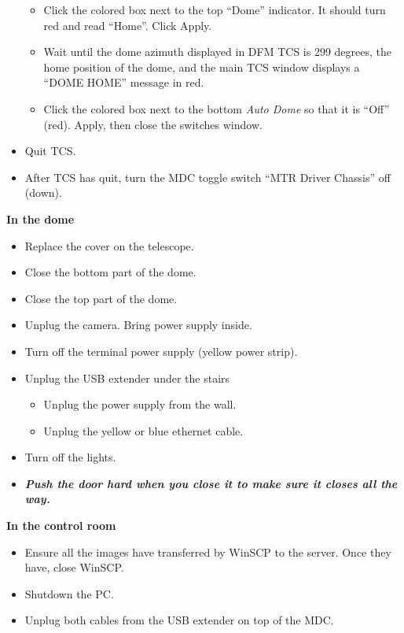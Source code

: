 \documentclass[letterpaper, 12pt]{report}
\newcommand{\location}[1]{\noindent\large{\textbf{#1}}}
\newcommand{\indome}{\location{In the dome}}
\newcommand{\incontrol}{\location{In the control room}}
\begin{document}
\begin{itemize}
\begin{itemize}
			\item Click the colored box next to the top ``Dome'' indicator. It should turn red and read ``Home''. Click Apply.
			\item Wait until the dome azimuth displayed in DFM TCS is 299 degrees, the home position of the dome, and the main TCS window displays a ``DOME HOME'' message in red.
			\item Click the colored box next to the bottom \emph{Auto Dome} so that it is ``Off'' (red). Apply, then close the switches window.
		\end{itemize}
		\item Quit TCS.
		\item After TCS has quit, turn the MDC toggle switch ``MTR Driver Chassis'' off (down).
	\end{itemize}

\indome

\begin{itemize}
	\item Replace the cover on the telescope.
	\item Close the bottom part of the dome.
	\item Close the top part of the dome.
	\item Unplug the camera. Bring power supply inside.
	\item Turn off the terminal power supply (yellow power strip).
	\item Unplug the USB extender under the stairs
		\begin{itemize}
			\item Unplug the power supply from the wall.
			\item Unplug the yellow or blue ethernet cable.
		\end{itemize}
	\item Turn off the lights.
	\item \textbf{\emph{Push the door hard when you close it to make sure it closes all the way.}}
\end{itemize}

\incontrol

\begin{itemize}
	\item Ensure all the images have transferred by WinSCP to the server. Once they have, close WinSCP.
	\item Shutdown the PC.
	\item Unplug both cables from the USB extender on top of the MDC.
\end{itemize}
\end{document}
